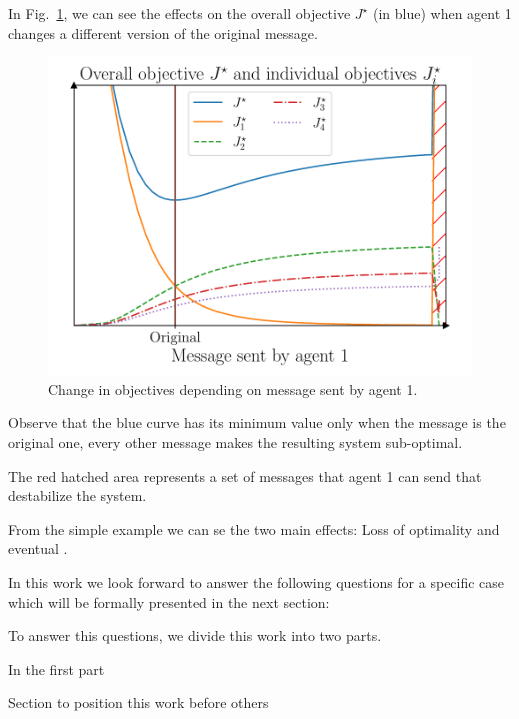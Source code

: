 \documentclass[../main.tex]{subfiles}
\begin{document}
\begin{example}
  In Fig.~\ref{fig:change_in_j}, we can see the effects on the overall objective $J^{\star}$ (in blue) when agent 1 changes a different version of the original message.
  \begin{figure}[H]
    \centering
    \includegraphics[width=.55\textwidth]{../img/qualitative_example.pdf}
    \caption{Change in objectives depending on message sent by agent 1.}\label{fig:change_in_j}
  \end{figure}
  Observe that the blue curve has its minimum value only when the message is the original one, every other message makes the resulting system sub-optimal.

  The red hatched area represents a set of messages that agent 1 can send that destabilize the system.
\end{example}

From the simple example we can se the two main effects: Loss of optimality and eventual .

In this work we look forward to answer the following questions for a specific case which will be formally presented in the next section:


To answer this questions, we divide this work into two parts.

In the first part



Section to position this work before others
\end{document}
